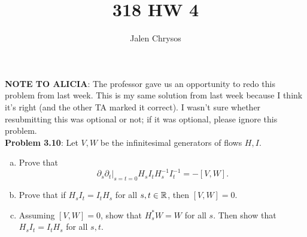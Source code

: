 \documentclass{amsart}
\title{318 HW 4}
\author{Jalen Chrysos}
\begin{document}
	
\maketitle

\textbf{NOTE TO ALICIA}: The professor gave us an opportunity to redo this problem from last week. This is my same solution from last week because I think it's right (and the other TA marked it correct). I wasn't sure whether resubmitting this was optional or not; if it was optional, please ignore this problem.\\

\textbf{Problem 3.10}: Let $V,W$ be the infinitesimal generators of flows $H,I$. 
\begin{enumerate}[(a)]
	\item Prove that 
	$$
	\partial_s \partial_t\big|_{s=t=0} H_sI_tH_s^{-1}I_t^{-1} = -[V,W].
	$$
	\item Prove that if $H_sI_t=I_tH_s$ for all $s,t\in \mathbb{R}$, then $[V,W]=0$.
	\item Assuming $[V,W]=0$, show that $H_s^*W=W$ for all $s$. Then show that $H_sI_t=I_tH_s$ for all $s,t$.
\end{enumerate}
\end{document}
